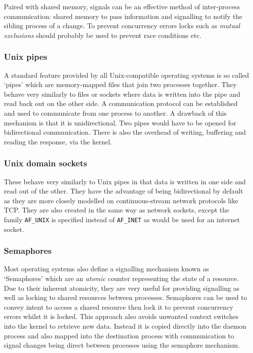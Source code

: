 \documentclass[11pt,a4paper,british]{bhamarticle}
\begin{document}
\begin{multicols}{2}
Paired with shared memory, signals can be an effective method of inter-process communication: shared memory to pass information and signalling to notify the sibling process of a change. To prevent concurrency errors locks such as \textit{mutual exclusions} should probably be used to prevent race conditions etc.

\subsubsection{Unix pipes}
A standard feature provided by all Unix-compatible operating systems is so called `pipes' which are memory-mapped files that join two processes together. They behave very similarly to files or sockets where data is written into the pipe and read back out on the other side. A communication protocol can be established and used to communicate from one process to another. A drawback of this mechanism is that it is unidirectional. Two pipes would have to be opened for bidirectional communication. There is also the overhead of writing, buffering and reading the response, via the kernel.

\subsubsection{Unix domain sockets}
These behave very similarly to Unix pipes in that data is written in one side and read out of the other. They have the advantage of being bidirectional by default as they are more closely modelled on continuous-stream network protocols like TCP\@. They are also created in the same way as network sockets, except the family \texttt{AF\_UNIX} is specified instead of \texttt{AF\_INET} as would be used for an internet socket.

\subsubsection{Semaphores}
Most operating systems also define a signalling mechanism known as `Semaphores' which are an \textit{atomic} counter representing the state of a resource. Due to their inherent atomicity, they are very useful for providing signalling as well as locking to shared resources between processes. Semaphores can be used to convey intent to access a shared resource then lock it to prevent concurrency errors whilst it is locked. This approach also avoids unwanted context switches into the kernel to retrieve new data. Instead it is copied directly into the daemon process and also mapped into the destination process with communication to signal changes being direct between processes using the semaphore mechanism.


\end{multicols}
\end{document}
